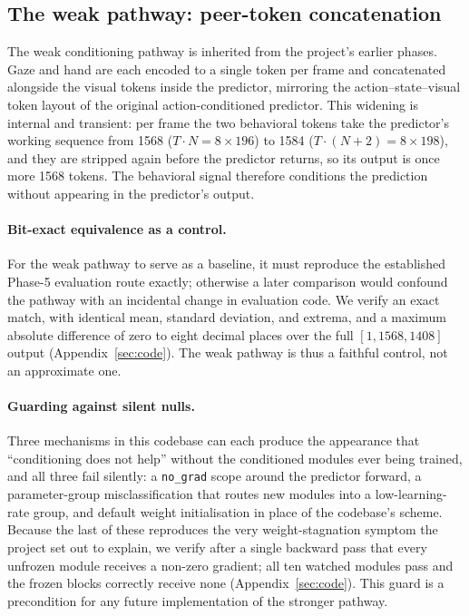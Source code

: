 \subsection{The weak pathway: peer-token concatenation}
\label{subsec:method-weak}

The weak conditioning pathway is inherited from the project's earlier phases.
Gaze and hand are each encoded to a single token per frame and concatenated
alongside the visual tokens inside the predictor, mirroring the
action--state--visual token layout of the original action-conditioned predictor.
This widening is internal and transient: per frame the two behavioral tokens
take the predictor's working sequence from \num{1568} ($T\cdot N = 8\times196$)
to \num{1584} ($T\cdot(N{+}2) = 8\times198$), and they are stripped again before
the predictor returns, so its output is once more \num{1568} tokens. The
behavioral signal therefore conditions the prediction without appearing in the
predictor's output.

\paragraph{Bit-exact equivalence as a control.}
For the weak pathway to serve as a baseline, it must reproduce the established
Phase-5 evaluation route exactly; otherwise a later comparison would confound
the pathway with an incidental change in evaluation code. We verify an exact
match, with identical mean, standard deviation, and extrema, and a maximum
absolute difference of zero to eight decimal places over the full
$[1, 1568, 1408]$ output (Appendix~\ref{sec:code}). The weak pathway is thus a
faithful control, not an approximate one.

\paragraph{Guarding against silent nulls.}
Three mechanisms in this codebase can each produce the appearance that
``conditioning does not help'' without the conditioned modules ever being
trained, and all three fail silently: a \texttt{no\_grad} scope around the
predictor forward, a parameter-group misclassification that routes new modules
into a low-learning-rate group, and default weight initialisation in place of the
codebase's scheme. Because the last of these reproduces the very
weight-stagnation symptom the project set out to explain, we verify after a
single backward pass that every unfrozen module receives a non-zero gradient;
all ten watched modules pass and the frozen blocks correctly receive none
(Appendix~\ref{sec:code}). This guard is a precondition for any future
implementation of the stronger pathway.

